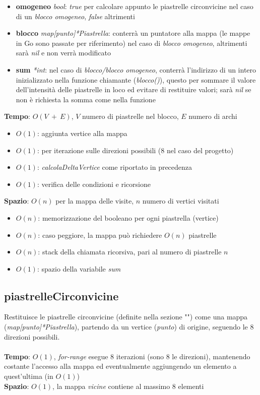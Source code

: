 \documentclass{article}
\begin{document}
\begin{itemize}
  \item \textbf{omogeneo} \textit{bool}: \textit{true} per calcolare appunto le piastrelle circonvicine nel caso di un \textit{blocco omogeneo}, \textit{false} altrimenti
  \item \textbf{blocco} \textit{map[punto]*Piastrella}: conterrà un puntatore alla mappa (le mappe in Go sono passate per riferimento) nel caso di \textit{blocco omogeneo}, altrimenti sarà \textit{nil} e non verrà modificato
  \item \textbf{sum} \textit{*int}: nel caso di \textit{blocco/blocco omogeneo}, conterrà l'indirizzo di un intero inizializzato nella funzione chiamante (\textit{blocco()}), questo per sommare il valore dell'intensità delle piastrelle in loco ed evitare di restituire valori; sarà \textit{nil} se non è richiesta la somma come nella funzione 
\end{itemize}

\textbf{Tempo}: \(O(V\ +\ E)\), \(V\) numero di piastrelle nel blocco, \(E\) numero di archi
\begin{itemize}
  \item \(O(1)\): aggiunta vertice alla mappa
  \item \(O(1)\): per iterazione sulle direzioni possibili (8 nel caso del progetto)
  \item \(O(1)\): \textit{calcolaDeltaVertice} come riportato in precedenza
  \item \(O(1)\): verifica delle condizioni e ricorsione
\end{itemize}
\textbf{Spazio}: \(O(n)\) per la mappa delle visite, \(n\) numero di vertici visitati
\begin{itemize}
  \item \(O(n)\): memorizzazione del booleano per ogni piastrella (vertice)
  \item \(O(n)\): caso peggiore, la mappa può richiedere \(O(n)\) piastrelle
  \item \(O(n)\): stack della chiamata ricorsiva, pari al numero di piastrelle \(n\)
  \item \(O(1)\): spazio della variabile \textit{sum} 
\end{itemize}

\subsection{piastrelleCirconvicine}
Restituisce le piastrelle circonvicine (definite nella sezione "") come una mappa (\textit{map[punto]*Piastrella}), partendo da un vertice (\textit{punto}) di origine, seguendo le 8 direzioni possibili.
\\ \\
\textbf{Tempo}: \(O(1)\), \textit{for-range} esegue 8 iterazioni (sono 8 le direzioni), mantenendo costante l'accesso alla mappa ed eventualmente aggiungendo un elemento a quest'ultima (in \(O(1)\))\\
\textbf{Spazio}: \(O(1)\), la mappa \textit{vicine} contiene al massimo 8 elementi
\end{document}
